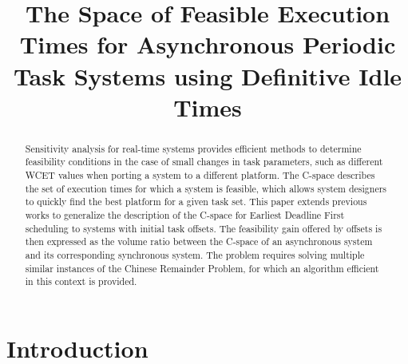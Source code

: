 \documentclass[conference]{IEEEtran}
\begin{document}
\title{The Space of Feasible Execution Times for Asynchronous Periodic Task
Systems using Definitive Idle Times}


\author{
\and
{}
\and
{}
}

\maketitle

\begin{abstract}
	Sensitivity analysis for real-time systems provides efficient methods to determine feasibility
	conditions in the case of small changes in task parameters, such as
	different WCET values when porting a system to a different platform. The C-space describes the set of execution
	times for which a system is feasible, which allows system designers to quickly
	find the best platform for a given task set. This paper extends previous works
	to generalize the description of the C-space for Earliest Deadline First
	scheduling to systems with initial task offsets. The feasibility gain offered
	by offsets is then expressed as the volume ratio between the C-space of an
	asynchronous system and its corresponding synchronous system. The problem
	requires solving multiple similar instances of the Chinese Remainder Problem,
	for which an algorithm efficient in this context is provided.
\end{abstract}

%

\section{Introduction}
\end{document}
